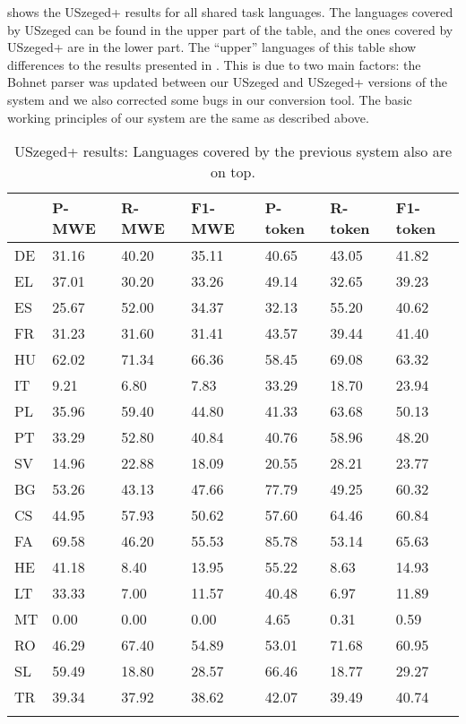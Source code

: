 \documentclass[output=paper,
modfonts,
]{langscibook}
\begin{document}
 shows the USzeged+ results for all shared task languages. The languages covered by USzeged can be found in the upper part of the table, and the ones covered by USzeged+ are in the lower part. The ``upper'' languages of this table show differences to the results presented in \citep{Simko2017}. This is due to two main factors: the Bohnet parser was updated between our USzeged and USzeged+ versions of the system and we also corrected some bugs in our conversion tool. The basic working principles of our system are the same as described above.

\begin{table}
\centering
\caption{USzeged+ results: Languages covered by the previous system also are on top.}
\label{resultstable2}
\begin{tabular}{lllllll}
  \lsptoprule
& P-MWE & R-MWE  & F1-MWE  & P-token & R-token & F1-token \\
 \midrule
DE     & 31.16 & 40.20 & 35.11 & 40.65 & 43.05 & 41.82   \\
EL     & 37.01 & 30.20 & 33.26 & 49.14 & 32.65 & 39.23   \\
ES     & 25.67 & 52.00 & 34.37 & 32.13 & 55.20 & 40.62   \\
FR     & 31.23 & 31.60 & 31.41 & 43.57 & 39.44 & 41.40   \\
HU     & 62.02 & 71.34 & 66.36 & 58.45 & 69.08 & 63.32   \\
IT     & 9.21 & 6.80 & 7.83 & 33.29 & 18.70 & 23.94   \\
PL     & 35.96 & 59.40 & 44.80 & 41.33 & 63.68 & 50.13   \\
PT     & 33.29 & 52.80 & 40.84 & 40.76 & 58.96 & 48.20   \\
SV     & 14.96 & 22.88 & 18.09 & 20.55 & 28.21 & 23.77   \\
   \midrule 
BG     & 53.26 & 43.13 & 47.66 & 77.79 & 49.25 & 60.32   \\
CS     & 44.95 & 57.93 & 50.62 & 57.60 & 64.46 & 60.84   \\
FA     & 69.58 & 46.20 & 55.53 & 85.78 & 53.14 & 65.63   \\
HE     & 41.18 & 8.40 & 13.95 & 55.22 & 8.63 & 14.93  \\
LT     & 33.33 & 7.00 & 11.57 & 40.48 & 6.97 & 11.89  \\
MT     & 0.00 & 0.00 & 0.00 & 4.65 & 0.31 & 0.59  \\
RO     & 46.29 & 67.40 & 54.89 & 53.01 & 71.68 & 60.95  \\
SL     & 59.49 & 18.80 & 28.57 & 66.46 & 18.77 & 29.27  \\
TR     & 39.34 & 37.92 & 38.62 & 42.07 & 39.49 & 40.74  \\

  \lspbottomrule
\end{tabular}
\end{table}
\end{document}
